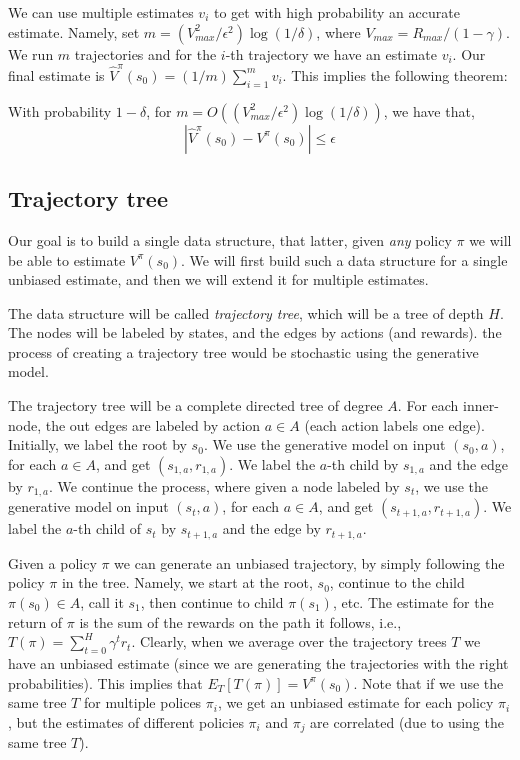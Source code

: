 We can use multiple estimates $v_i$ to get with high probability an
accurate estimate. Namely, set $m=(V_{max}^2/\epsilon^2)\log
(1/\delta)$, where $V_{max}=R_{max}/(1-\gamma)$. We run $m$
trajectories and for the $i$-th trajectory we have an estimate
$v_i$. Our final estimate is $\hat{V}^\pi(s_0) =(1/m)\sum_{i=1}^m
v_i$. This implies the following theorem:

\begin{theorem}
With probability $1-\delta$, for $m=O((V_{max}^2/\epsilon^2)\log
(1/\delta))$, we have that,
\[
|\hat{V}^\pi(s_0) -V^\pi(s_0)|\leq \epsilon
\]
\end{theorem}

\subsection{Trajectory tree}

Our goal is to build a single data structure, that latter, given
{\em any} policy $\pi$ we will be able to estimate $V^\pi(s_0)$. We
will first build such a data structure for a single unbiased
estimate, and then we will extend it for multiple estimates.

The data structure will be called {\em trajectory tree}, which will
be a tree of depth $H$. The nodes will be labeled by states, and the
edges by actions (and rewards). the process of creating a trajectory
tree would be stochastic using the generative model.

The trajectory tree will be a complete directed tree of degree $A$.
For each inner-node, the out edges are labeled by action $a\in A$
(each action labels one edge).
%
Initially, we label the root by $s_0$. We use the generative model
on input $(s_0,a)$, for each $a\in A$, and get $(s_{1,a},r_{1,a})$.
We label the $a$-th child by $s_{1,a}$ and the edge by $r_{1,a}$. We
continue the process, where given a node labeled by $s_t$, we use
the generative model on input $(s_t,a)$, for each $a\in A$, and get
$(s_{t+1,a},r_{t+1,a})$. We label the $a$-th child of $s_t$ by
$s_{t+1,a}$ and the edge by $r_{t+1,a}$.

Given a policy $\pi$ we can generate an unbiased trajectory, by
simply following the policy $\pi$ in the tree. Namely, we start at
the root, $s_0$, continue to the child $\pi(s_0)\in A$, call it
$s_1$, then continue to child $\pi(s_1)$, etc. The estimate for the
return of $\pi$ is the sum of the rewards on the path it follows,
i.e., $T(\pi)=\sum_{t=0}^H \gamma^t r_t$. Clearly, when we average
over the trajectory trees $T$ we have an unbiased estimate (since we
are generating the trajectories with the right probabilities). This
implies that $E_T [T(\pi)]=V^\pi(s_0)$. Note that if we use the same
tree $T$ for multiple polices $\pi_i$, we get an unbiased estimate
for each policy $\pi_i$, but the estimates of different policies
$\pi_i$ and $\pi_j$ are correlated (due to using the same tree $T$).

